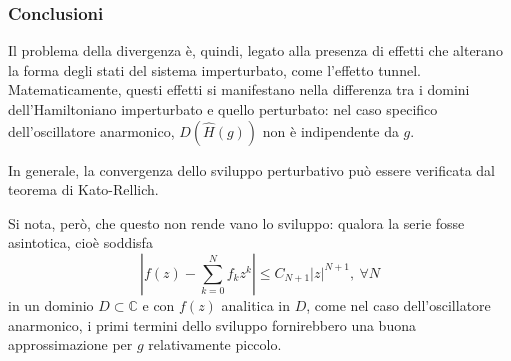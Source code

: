 \documentclass[10pt]{beamer}
\begin{document}
   \begin{frame}
	   \frametitle{Conclusioni}
	   Il problema della divergenza \`e, quindi, legato alla presenza di effetti che alterano la forma degli stati del sistema imperturbato, come l'effetto tunnel.
	   Matematicamente, questi effetti si manifestano nella differenza tra i domini dell'Hamiltoniano imperturbato e quello perturbato: nel caso specifico dell'oscillatore anarmonico, $D(\hat{H}(g))$ non \`e indipendente da $g$. 
	   
	   In generale, la convergenza dello sviluppo perturbativo pu\`o essere verificata dal teorema di Kato-Rellich.

	   \vspace{.25cm}
	   Si nota, per\`o, che questo non rende vano lo sviluppo: qualora la serie fosse asintotica, cio\`e soddisfa
\[
\left\lvert f(z) - \sum_{k=0}^{N} f_k z^k \right\rvert \le  C_{N+1} \lvert z \rvert ^{N+1} , \ \forall N
\] 
	   in un dominio $D \subset \mathbb{C}$ e con $f(z)$ analitica in $D$, come nel caso dell'oscillatore anarmonico, i primi termini dello sviluppo fornirebbero una buona approssimazione per $g$ relativamente piccolo.
   \end{frame}
\end{document}
